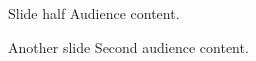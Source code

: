 \documentclass[aspectratio=169]{beamer}
\begin{document}
\begin{frame}{Slide half}
Audience content.
\end{frame}
\begin{frame}{Another slide}
Second audience content.
\end{frame}
\end{document}
